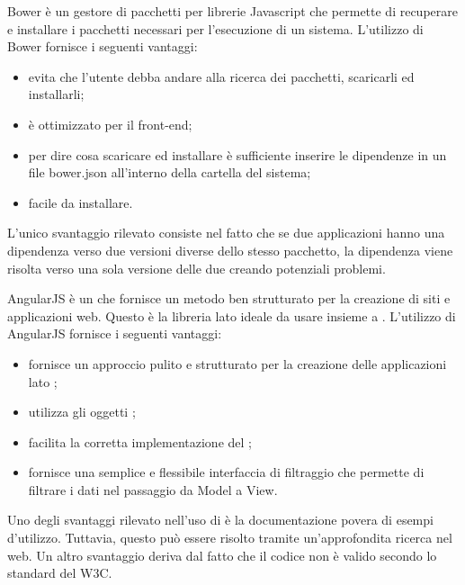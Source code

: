 Bower è un gestore di pacchetti per librerie Javascript che permette di recuperare e installare i pacchetti necessari per l'esecuzione di un sistema.
L'utilizzo di Bower fornisce i seguenti vantaggi:
\begin{itemize}
	\item evita che l'utente debba andare alla ricerca dei pacchetti, scaricarli ed installarli;
	\item è ottimizzato per il front-end;
	\item per dire cosa scaricare ed installare è sufficiente inserire le dipendenze in un file bower.json all'interno della cartella del sistema;
	\item facile da installare.
\end{itemize}
L'unico svantaggio rilevato consiste nel fatto che se due applicazioni hanno una dipendenza verso due versioni diverse dello stesso pacchetto, la dipendenza viene risolta verso una sola versione delle due creando potenziali problemi.


AngularJS è un    che fornisce un metodo ben strutturato per la creazione di siti e applicazioni web. Questo  è la libreria lato  ideale da usare insieme a .
L'utilizzo di AngularJS fornisce i seguenti vantaggi:
\begin{itemize}
\item fornisce un approccio pulito e strutturato per la creazione delle applicazioni lato ;
\item utilizza gli oggetti ;
\item facilita la corretta implementazione del  ;
\item fornisce una semplice e flessibile interfaccia di filtraggio che permette di filtrare i dati nel passaggio da Model a View.
\end{itemize}
Uno degli svantaggi rilevato nell'uso di  è la documentazione povera di esempi d'utilizzo. Tuttavia, questo può essere risolto tramite un'approfondita ricerca nel web. Un altro svantaggio deriva dal fatto che il codice non è valido secondo lo standard del W3C. 

